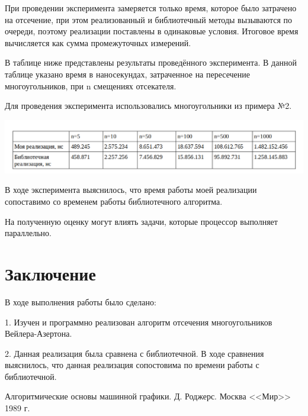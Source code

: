 \documentclass[12pt]{article}
\begin{document}
При проведении эксперимента замеряется только время, которое было затрачено на отсечение, при
этом реализованный и библиотечный методы вызываются по очереди, поэтому реализации поставлены в
одинаковые условия. Итоговое время вычисляется как сумма промежуточных измерений.




В таблице ниже представлены результаты проведённого эксперимента. В данной таблице указано время в
наносекундах, затраченное  на пересечение многоугольников, при n смещениях отсекателя.

Для проведения эксперимента использовались многоугольники из примера №2.


\vskip 1cm
{
    \centering
    \includegraphics[width=1\linewidth]{результаты.png}

    \label{fig:i5}
}
\vskip 1cm


В ходе эксперимента выяснилось, что время работы моей реализации сопоставимо со временем работы библиотечного алгоритма.

На полученную оценку могут влиять задачи, которые процессор выполняет параллельно.

 \newpage
 
 \section{Заключение}
 
 В ходе выполнения работы было сделано:
 
 1. Изучен и программно реализован алгоритм отсечения многоугольников Вейлера-Азертона.
 
 2. Данная реализация была сравнена с библиотечной. В ходе сравнения выяснилось, что данная реализация сопостовима по времени работы с библиотечной.
 
 














 \newpage
\renewcommand{\refname}{Список использованных источников}
\begin{thebibliography}{99}

  

      {Алгоритмические основы машинной графики.
Д. Роджерс. Москва <<Мир>> 1989 г.}
    
     

\end{thebibliography}
\end{document}

